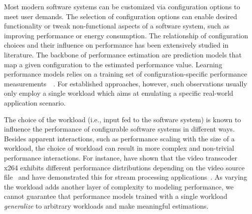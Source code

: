 
Most modern software systems can be customized via configuration options to meet user demands. The selection of configuration options can enable desired functionality or tweak non-functional aspects of a software system, such as improving performance or energy consumption. The relationship of configuration choices and their influence on performance has been extensively studied in literature. The backbone of performance estimation are prediction models that map a given configuration to the estimated performance value. Learning performance models relies on a training set of configuration-specific performance measurements~~\cite{dorn2020,siegmundPerformanceinfluenceModelsHighly2015,haDeepPerf2019,perfAL,guoVariabilityawarePerformancePrediction2013,sarkarCostEfficientSamplingPerformance,guo_2018_data,fourier_learning_2015,perLasso}. For established approaches, however, such observations usually only employ a single workload which aims at emulating a specific real-world application scenario.

The choice of the workload (i.e., input fed to the software system) is known to influence the performance of configurable software systems in different ways. Besides apparent interactions, such as performance scaling with the size of a workload, the choice of workload can result in more complex and non-trivial performance interactions. For instance, \citeauthor{alves_sampling_2020} have shown that the video transcoder \textsf{x264} exhibits different performance distributions depending on the video source file~\cite{alves_sampling_2020} and \citeauthor{liao_2020_using_emse} have demonstrated this for stream processing applications~\cite{liao_2020_using_emse}. As varying the workload adds another layer of complexity to modeling performance, we cannot guarantee that performance models trained with a single workload \textit{generalize} to arbitrary workloads and make meaningful estimations. 

